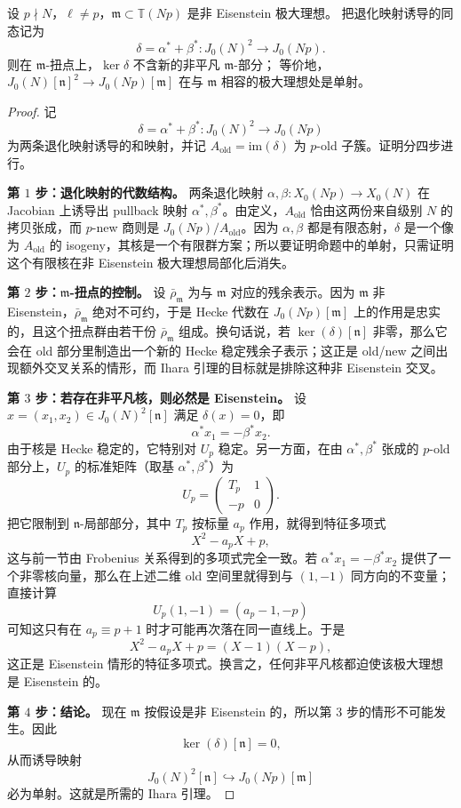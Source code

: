 \begin{theorem}
\label{thm:ch09-ihara-lemma}
设 $p\nmid N$，$\ell\neq p$，$\mathfrak m\subset \mathbb T(Np)$ 是非 Eisenstein 极大理想。
把退化映射诱导的同态记为
\[
  \delta=\alpha^*+\beta^*\colon J_0(N)^2\to J_0(Np).
\]
则在 $\mathfrak m$-扭点上，$\ker \delta$ 不含新的非平凡 $\mathfrak m$-部分；
等价地，$J_0(N)[\mathfrak n]^2\to J_0(Np)[\mathfrak m]$ 在与 $\mathfrak m$ 相容的极大理想处是单射。
\end{theorem}

\begin{proof}
记
\[
\delta=\alpha^*+\beta^* \colon J_0(N)^2 \longrightarrow J_0(Np)
\]
为两条退化映射诱导的和映射，并记 $A_{\mathrm{old}}=\mathrm{im}(\delta)$ 为 $p$-old 子簇。证明分四步进行。

\textbf{第 $1$ 步：退化映射的代数结构。}
两条退化映射 $\alpha,\beta\colon X_0(Np)\to X_0(N)$ 在 Jacobian 上诱导出 pullback 映射 $\alpha^*,\beta^*$。由定义，$A_{\mathrm{old}}$ 恰由这两份来自级别 $N$ 的拷贝张成，而 $p$-new 商则是 $J_0(Np)/A_{\mathrm{old}}$。因为 $\alpha,\beta$ 都是有限态射，$\delta$ 是一个像为 $A_{\mathrm{old}}$ 的 isogeny，其核是一个有限群方案；所以要证明命题中的单射，只需证明这个有限核在非 Eisenstein 极大理想局部化后消失。

\textbf{第 $2$ 步：$\mathfrak{m}$-扭点的控制。}
设 $\bar\rho_{\mathfrak{m}}$ 为与 $\mathfrak{m}$ 对应的残余表示。因为 $\mathfrak{m}$ 非 Eisenstein，$\bar\rho_{\mathfrak{m}}$ 绝对不可约，于是 Hecke 代数在 $J_0(Np)[\mathfrak{m}]$ 上的作用是忠实的，且这个扭点群由若干份 $\bar\rho_{\mathfrak{m}}$ 组成。换句话说，若 $\ker(\delta)[\mathfrak{n}]$ 非零，那么它会在 old 部分里制造出一个新的 Hecke 稳定残余子表示；这正是 old/new 之间出现额外交叉关系的情形，而 Ihara 引理的目标就是排除这种非 Eisenstein 交叉。

\textbf{第 $3$ 步：若存在非平凡核，则必然是 Eisenstein。}
设 $x=(x_1,x_2)\in J_0(N)^2[\mathfrak{n}]$ 满足 $\delta(x)=0$，即
\[
\alpha^*x_1=-\beta^*x_2.
\]
由于核是 Hecke 稳定的，它特别对 $U_p$ 稳定。另一方面，在由 $\alpha^*,\beta^*$ 张成的 $p$-old 部分上，$U_p$ 的标准矩阵（取基 $\alpha^*,\beta^*$）为
\[
U_p=
\begin{pmatrix}
T_p & 1\\
-p & 0
\end{pmatrix}.
\]
把它限制到 $\mathfrak{n}$-局部部分，其中 $T_p$ 按标量 $a_p$ 作用，就得到特征多项式
\[
X^2-a_pX+p,
\]
这与前一节由 Frobenius 关系得到的多项式完全一致。若 $\alpha^*x_1=-\beta^*x_2$ 提供了一个非零核向量，那么在上述二维 old 空间里就得到与 $(1,-1)$ 同方向的不变量；直接计算
\[
U_p(1,-1)=(a_p-1,-p)
\]
可知这只有在 $a_p\equiv p+1$ 时才可能再次落在同一直线上。于是
\[
X^2-a_pX+p=(X-1)(X-p),
\]
这正是 Eisenstein 情形的特征多项式。换言之，任何非平凡核都迫使该极大理想是 Eisenstein 的。

\textbf{第 $4$ 步：结论。}
现在 $\mathfrak{m}$ 按假设是非 Eisenstein 的，所以第 $3$ 步的情形不可能发生。因此
\[
\ker(\delta)[\mathfrak{n}]=0,
\]
从而诱导映射
\[
J_0(N)^2[\mathfrak{n}] \hookrightarrow J_0(Np)[\mathfrak{m}]
\]
必为单射。这就是所需的 Ihara 引理。
\end{proof}

